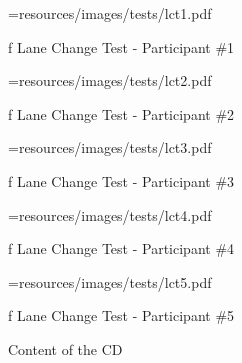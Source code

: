 \midinsert {}
\picw=\hsize \cinspic resources/images/tests/lct1.pdf
\caption/f Lane Change Test - Participant \#1
\endinsert

\midinsert {}
\picw=\hsize \cinspic resources/images/tests/lct2.pdf
\caption/f Lane Change Test - Participant \#2
\endinsert

\midinsert {}
\picw=\hsize \cinspic resources/images/tests/lct3.pdf
\caption/f Lane Change Test - Participant \#3
\endinsert

\midinsert {}
\picw=\hsize \cinspic resources/images/tests/lct4.pdf
\caption/f Lane Change Test - Participant \#4
\endinsert

\midinsert {}
\picw=\hsize \cinspic resources/images/tests/lct5.pdf
\caption/f Lane Change Test - Participant \#5
\endinsert


\nextoddpage

\app Content of the CD

